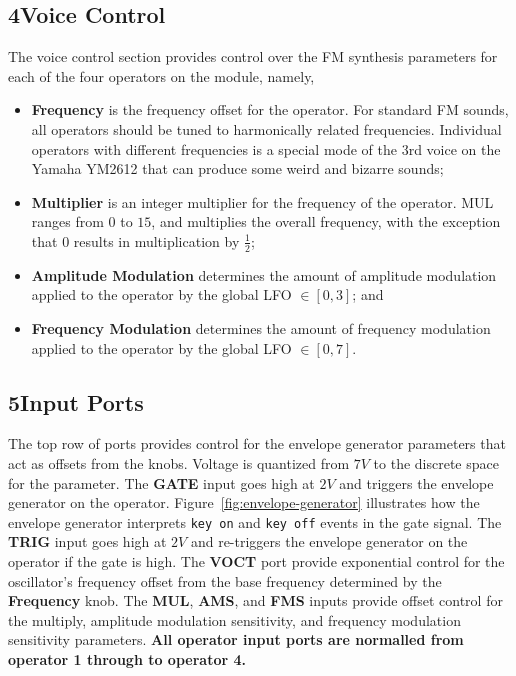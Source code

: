 \documentclass[12pt,letter]{article}
\begin{document}
\subsection*{4{\quad}Voice Control}

The voice control section provides control over the FM synthesis parameters for each of the four operators on the module, namely,

\begin{itemize}
 \item \textbf{Frequency} is the frequency offset for the operator. For standard FM sounds, all operators should be tuned to harmonically related frequencies. Individual operators with different frequencies is a special mode of the 3rd voice on the Yamaha YM2612 that can produce some weird and bizarre sounds;
 \item \textbf{Multiplier} is an integer multiplier for the frequency of the operator. MUL ranges from $0$ to $15$, and multiplies the overall frequency, with the exception that $0$ results in multiplication by $\frac{1}{2}$;
 \item \textbf{Amplitude Modulation} determines the amount of amplitude modulation applied to the operator by the global LFO $\in [0, 3]$; and
 \item \textbf{Frequency Modulation} determines the amount of frequency modulation applied to the operator by the global LFO $\in [0, 7]$.
\end{itemize}

\subsection*{5{\quad}Input Ports}

The top row of ports provides control for the envelope generator parameters that act as offsets from the knobs. Voltage is quantized from $7V$ to the discrete space for the parameter. The \textbf{GATE} input goes high at $2V$ and triggers the envelope generator on the operator. Figure~\ref{fig:envelope-generator} illustrates how the envelope generator interprets \texttt{key on} and \texttt{key off} events in the gate signal. The \textbf{TRIG} input goes high at $2V$ and re-triggers the envelope generator on the operator if the gate is high. The \textbf{VOCT} port provide exponential control for the oscillator's frequency offset from the base frequency determined by the \textbf{Frequency} knob. The \textbf{MUL}, \textbf{AMS}, and \textbf{FMS} inputs provide offset control for the multiply, amplitude modulation sensitivity, and frequency modulation sensitivity parameters. \textbf{All operator input ports are normalled from operator 1 through to operator 4.}
\end{document}
